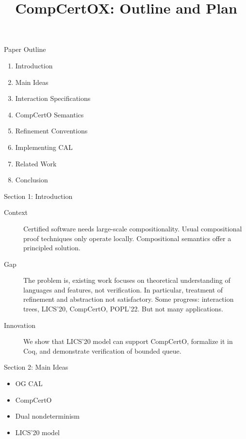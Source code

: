 \documentclass[aspectratio=1610,mathserif]{beamer}
\title{CompCertOX: Outline and Plan}
\begin{document}
\maketitle

\begin{frame}{Paper Outline}
  \begin{enumerate}
    \item Introduction
    \item Main Ideas
    \item Interaction Specifications
    \item CompCertO Semantics
    \item Refinement Conventions
    \item Implementing CAL
    \item Related Work
    \item Conclusion
  \end{enumerate}
\end{frame}

\begin{frame}{Section 1: Introduction}
  \begin{description}
    \item[Context]
      Certified software needs large-scale compositionality.
      Usual compositional proof techniques only operate locally.
      Compositional semantics offer a principled solution.
    \item[Gap]
      The problem is,
      existing work focuses on theoretical understanding
      of languages and features,
      not verification.
      In particular,
      treatment of refinement and abstraction not satisfactory.
      Some progress:
      interaction trees, LICS'20, CompCertO, POPL'22.
      But not many applications.
    \item[Innovation] 
      We show that LICS'20 model can support CompCertO,
      formalize it in Coq,
      and demonstrate verification of bounded queue.
  \end{description}
\end{frame}

\begin{frame}{Section 2: Main Ideas}
  \begin{itemize}
    \item OG CAL
    \item CompCertO
    \item Dual nondeterminism
    \item LICS'20 model
  \end{itemize}
\end{frame}
\end{document}

